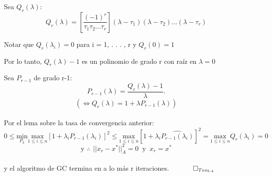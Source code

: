 \documentclass[12pt]{article}
\begin{document}
\begin{enumerate}
  Sea $Q_r(\lambda)$: $$Q_r(\lambda) =\left[ \frac{(-1)^r}{\tau_1 \tau_2 . . . \tau_r}\right] (\lambda - \tau_1)(\lambda-\tau_2) ... (\lambda-\tau_r)$$
		   
		   Notar que $Q_r(\lambda_i) = 0$ para i = 1, . . . , r y $Q_r(0) = 1$
		   
		   Por lo tanto, $Q_r(\lambda) -1$ es un polinomio de grado r con ra\'iz en $\lambda=0$
		   
		   Sea $P_{r-1}$ de grado r-1: $$P_{r-1}(\lambda) = \frac{Q_r(\lambda)-1}{\lambda}.$$ 
		   $$\left(\iff Q_r(\lambda) = 1 + \lambda P_{r-1}(\lambda)\right)$$ \\
		   Por el lema sobre la tasa de convergencia anterior:
		   $$0 \le \underset{P_k}{\text{min}} \underset{1\le i \le n}{\text{max}} [1+ \lambda_iP_{r-1}(\lambda_i)]^2 \le \underset{1\le i \le n}{\text{max}} [1+ \lambda_i\hat{P_{r-1}(\lambda_i)}]^2 = \underset{1\le i \le n}{\text{max}} Q_r(\lambda_i) = 0$$
		   $$\text{y  } \therefore \ \ ||x_r - x^*||_A^2 = 0\  \text{  y } \  x_r = x^*$$ \\
		   y el algoritmo de GC termina en a lo m\'as r iteraciones.\quad \ \ \  $\qed_{Teo_{5.4}} $ \\


\end{enumerate}
\end{document}
